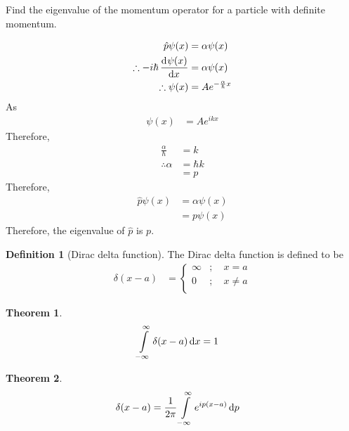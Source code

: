 \documentclass[titlepage, fleqn, a4paper, 12pt, twoside]{article}
\theoremstyle{definition}
\newtheorem{definition}{Definition}
\theoremstyle{theorem}
\newtheorem{theorem}{Theorem}
\begin{document}
\begin{question}
	Find the eigenvalue of the momentum operator for a particle with definite momentum.
\end{question}

\begin{solution}
	\begin{align*}
		\hat{p} \psi(x) &= \alpha \psi(x)\\
		\therefore -i \hbar \dod{\psi(x)}{x} &= \alpha \psi(x)\\
		\therefore \psi(x) &= A e^{-\frac{\alpha}{\hbar} x}
	\end{align*}
	As
	\begin{align*}
		\psi(x) &= A e^{i k x}
	\end{align*}
	Therefore,
	\begin{align*}
		\frac{\alpha}{\hbar} &= k\\
		\therefore \alpha &= \hbar k\\
		&= p
	\end{align*}
	Therefore,
	\begin{align*}
		\hat{p} \psi(x) &= \alpha \psi(x)\\
		&= p \psi(x)
	\end{align*}
	Therefore, the eigenvalue of $\hat{p}$ is $p$.
\end{solution}

\begin{definition}[Dirac delta function]
	The Dirac delta function is defined to be
	\begin{align*}
		\delta(x - a) &=
			\begin{cases}
				\infty &;\quad x = a\\
				0 &;\quad x \neq a\\
			\end{cases}
	\end{align*}
\end{definition}

\begin{theorem}
	\begin{align*}
		\int\limits_{-\infty}^{\infty} \delta(x - a) \dif x &= 1
	\end{align*}
\end{theorem}

\begin{theorem}
	\begin{align*}
		\delta(x - a) &= \frac{1}{2 \pi} \int\limits_{-\infty}^{\infty} e^{i p (x - a)} \dif p
	\end{align*}
\end{theorem}
\end{document}
